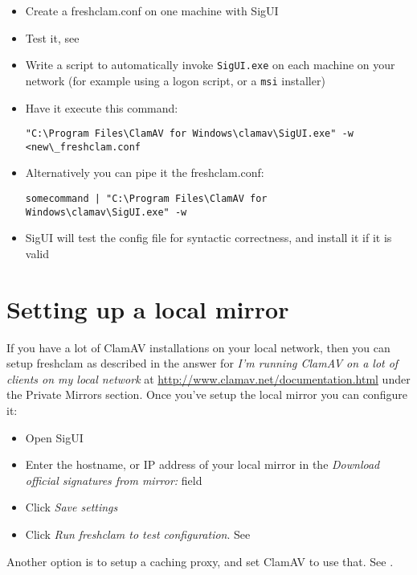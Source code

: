 \begin{itemize}
\begin{itemize}
\item Create a \gls{freshclam.conf} on one machine with \gls{SigUI}
\item Test it, see 
\item Write a script to automatically invoke \verb+SigUI.exe+ on each machine on your network (for example using a logon script, or a \verb+msi+ installer)
\item Have it execute this command:
\begin{lstlisting}
"C:\Program Files\ClamAV for Windows\clamav\SigUI.exe" -w <new\_freshclam.conf
\end{lstlisting}
\item Alternatively you can pipe it the freshclam.conf:
\begin{lstlisting}
somecommand | "C:\Program Files\ClamAV for Windows\clamav\SigUI.exe" -w
\end{lstlisting}

\item SigUI will test the config file for syntactic correctness, and install it if it is valid
\end{itemize}
\end{itemize}

\section{Setting up a local mirror}
\label{sec:localmirror}

If you have a lot of ClamAV installations on your local network, then you can setup \gls{freshclam} as described in the answer for  \emph{I’m running ClamAV on a lot of clients on my local network} at \url{http://www.clamav.net/documentation.html} under the Private Mirrors section.
Once you've setup the local mirror you can configure it:
\begin{itemize}
\item Open SigUI
\item Enter the hostname, or IP address of your local mirror in the \emph{Download official signatures from mirror:} field
\item Click \emph{Save settings}
\item Click \emph{Run freshclam to test configuration}. See 
\end{itemize}

Another option is to setup a caching proxy, and set ClamAV to use that. See .
